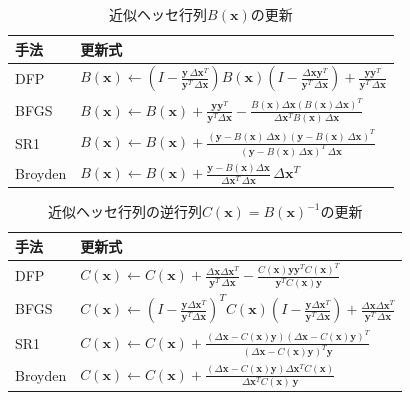 \begin{table}[t]
\centering
\caption{近似ヘッセ行列$B(\bm{x})$の更新}
\label{tab:hessian_update}
\begin{tabular}{l|l}
\hline
手法 & 更新式
\\
\hline
DFP 
&
$\displaystyle B(\bm{x}) \gets \left (I-\frac {\bm{y} \, \Delta\bm{x}^T} {\bm{y}^T \, \Delta\bm{x}} \right ) B(\bm{x}) \left (I-\frac {\Delta\bm{x} \bm{y}^T} {\bm{y}^T \, \Delta\bm{x}} \right )+\frac{\bm{y} \bm{y}^T} {\bm{y}^T \, \Delta\bm{x}}$
\\
BFGS
&
$\displaystyle B(\bm{x}) \gets B(\bm{x}) + \frac {\bm{y} \bm{y}^T}{\bm{y}^{T} \Delta\bm{x}} - \frac {B(\bm{x}) \Delta\bm{x} (B(\bm{x}) \Delta\bm{x})^T} {\Delta\bm{x}^{T} B(\bm{x}) \, \Delta\bm{x}}$
\\
SR1
&
$\displaystyle B(\bm{x}) \gets B(\bm{x}) +\frac {(\bm{y}-B(\bm{x}) \, \Delta\bm{x}) (\bm{y}-B(\bm{x}) \, \Delta\bm{x})^T}{(\bm{y}-B(\bm{x}) \, \Delta\bm{x})^T \, \Delta\bm{x}}$
\\
Broyden
&
$\displaystyle B(\bm{x}) \gets B(\bm{x})+\frac {\bm{y}-B(\bm{x}) \Delta\bm{x}}{\Delta\bm{x}^T \, \Delta\bm{x}} \, \Delta\bm{x}^T$
\\
\hline
\end{tabular}
\end{table}

\begin{table}[t]
\centering
\caption{近似ヘッセ行列の逆行列$C(\bm{x}) = B(\bm{x})^{-1}$の更新}
\label{tab:inv_hessian_update}
\begin{tabular}{l|l}
\hline
手法 & 更新式
\\
\hline
DFP 
&
$\displaystyle C(\bm{x}) \gets \displaystyle C(\bm{x}) + \frac {\Delta\bm{x} \Delta\bm{x}^T}{\bm{y}^{T} \, \Delta\bm{x}} - \frac {C(\bm{x}) \bm{y} \bm{y}^T C(\bm{x})^T} {\bm{y}^T C(\bm{x}) \bm{y}}$
\\
BFGS
&
$\displaystyle C(\bm{x}) \gets \left (I-\frac {\bm{y} \Delta\bm{x}^T} {\bm{y}^T \Delta\bm{x}} \right )^T C(\bm{x}) \left (I-\frac { \bm{y} \Delta\bm{x}^T} {\bm{y}^T \Delta\bm{x}} \right )+\frac
{\Delta\bm{x} \Delta\bm{x}^T} {\bm{y}^T \, \Delta\bm{x}}$
\\
SR1
&
$\displaystyle C(\bm{x}) \gets C(\bm{x})+\frac {(\Delta\bm{x}-C(\bm{x}) \bm{y}) (\Delta\bm{x}-C(\bm{x}) \bm{y})^T}{(\Delta\bm{x}-C(\bm{x}) \bm{y})^T \bm{y}}$
\\
Broyden
&
$\displaystyle C(\bm{x}) \gets C(\bm{x})+\frac {(\Delta\bm{x}-C(\bm{x}) \bm{y}) \Delta\bm{x}^T C(\bm{x})}{\Delta\bm{x}^T C(\bm{x}) \, \bm{y}}$
\\
\hline
\end{tabular}
\end{table}

